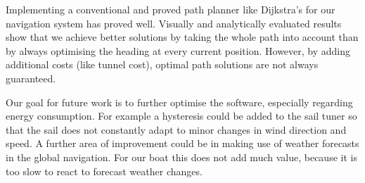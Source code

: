 Implementing a conventional and proved path planner like Dijkstra's for our
navigation system has proved well. Visually and analytically evaluated results
show that we achieve better solutions by taking the whole path into account
than by always optimising the heading at every current position. However, by
adding additional costs (like tunnel cost), optimal path solutions are not
always guaranteed.

Our goal for future work is to further optimise the software, especially
regarding energy consumption. For example a hysteresis could be added to the
sail tuner so that the sail does not constantly adapt to minor changes in wind
direction and speed. A further area of improvement could be in making use of
weather forecasts in the global navigation. For our boat this does not add much
value, because it is too slow to react to forecast weather changes.
